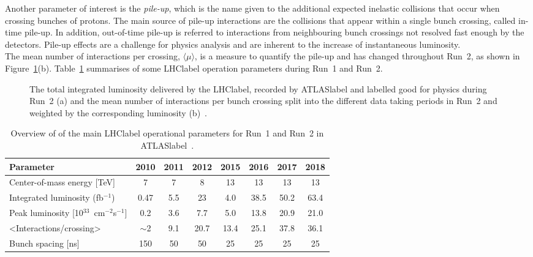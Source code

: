 Another parameter of interest is the \textit{pile-up}, which is the name given to the additional expected inelastic collisions that occur when crossing bunches of protons. The main source of pile-up interactions are the collisions that appear within a single bunch crossing, called in-time pile-up. In addition, out-of-time pile-up is referred to interactions from neighbouring bunch crossings not resolved fast enough by the detectors. Pile-up effects are a challenge for physics analysis and are inherent to the increase of instantaneous luminosity.\\ %

The mean number of interactions per crossing, $\langle\mu\rangle$, is a measure to quantify the pile-up and has changed throughout Run~2, as shown in Figure~\ref{figLHC:lumipileup}(b). Table~\ref{tabLHC:LHCparameters} summarises of some \acrshort{LHClabel} operation parameters during Run~1 and Run~2.

\begin{figure}[htbp]
    \RawFloats
    \begin{center}
    \quad
    \caption{
        The total integrated luminosity delivered by the \acrshort{LHClabel}, recorded by \acrshort{ATLASlabel} and labelled good for physics during Run~2 (a) and the mean number of interactions per bunch crossing split into the different data taking periods in Run~2 and weighted by the corresponding luminosity (b)~\cite{publiclumi}. 
    }
    \label{figLHC:lumipileup}
    \end{center}
\end{figure}

\begin{table}[htbp]
    \begin{tabular}{l|ccccccc}
    \toprule\toprule
    Parameter                                        & 2010    & 2011 & 2012 & 2015 & 2016 & 2017 & 2018 \\     \midrule
    Center-of-mass energy [TeV]                                  & 7       & 7    & 8    & 13   & 13   & 13   & 13   \\
    Integrated luminosity (fb$^{-1}$)      & 0.47    & 5.5  & 23   & 4.0  & 38.5 & 50.2 & 63.4 \\
    Peak luminosity [10$^{33}$~cm$^{-2}$s$^{-1}$]     & 0.2     & 3.6  & 7.7  & 5.0  & 13.8 & 20.9 & 21.0 \\
    <Interactions/crossing>                        & $\sim$2 & 9.1  & 20.7 & 13.4 & 25.1 & 37.8 & 36.1 \\
    Bunch spacing [ns]                               & 150     & 50   & 50   & 25   & 25   & 25   & 25   \\
    \bottomrule\bottomrule                               
    \end{tabular}
    \caption{Overview of of the main \acrshort{LHClabel} operational parameters for Run~1 and Run~2 in \acrshort{ATLASlabel}~\cite{publiclumi,publiclumiRun1}.}
    \label{tabLHC:LHCparameters}
    \end{table}

